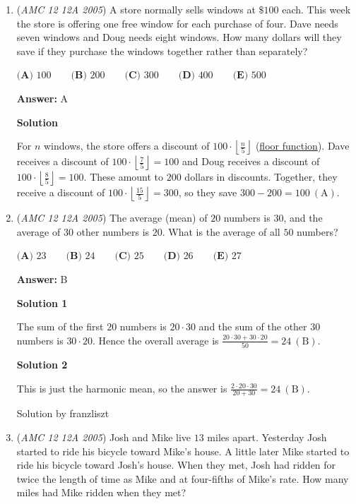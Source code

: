 \begin{enumerate}
 


	\item (\textit{AMC 12 12A 2005}) A store normally sells windows at $\$100$ each. This week the store is offering one free window for each purchase of four. Dave needs seven windows and Doug needs eight windows. How many dollars will they save if they purchase the windows together rather than separately?


 $\textbf{(A) } 100 \qquad \textbf{(B) } 200 \qquad \textbf{(C) } 300 \qquad \textbf{(D) } 400 \qquad \textbf{(E) } 500$

 \textbf{Answer: }A



\textbf{Solution}

For $n$ windows, the store offers a discount of $100 \cdot \left\lfloor\frac{n}{5}\right\rfloor$ (\href{https://artofproblemsolving.com/wiki/index.php?title=Floor\_function}{floor function}). Dave receives a discount of $100 \cdot \left\lfloor \frac{7}{5}\right \rfloor = 100$ and Doug receives a discount of $100 \cdot \left\lfloor \frac{8}{5}\right\rfloor = 100$. These amount to $200$ dollars in discounts. Together, they receive a discount of $100 \cdot \left\lfloor \frac{15}{5} \right\rfloor = 300$, so they save $300-200=100\ \mathrm{(A)}$.

 


	\item (\textit{AMC 12 12A 2005}) The average (mean) of $20$ numbers is $30$, and the average of $30$ other numbers is $20$. What is the average of all $50$ numbers?


 $\textbf{(A) } 23 \qquad \textbf{(B) } 24 \qquad \textbf{(C) } 25 \qquad \textbf{(D) } 26 \qquad \textbf{(E) } 27$

 \textbf{Answer: }B



\textbf{Solution 1}

The sum of the first $20$ numbers is $20 \cdot 30$ and the sum of the other $30$ numbers is $30\cdot 20$. Hence the overall average is $\frac{20 \cdot 30 + 30 \cdot 20}{50} = 24 \ \mathrm{(B)}$.

 



\textbf{Solution 2}

This is just the harmonic mean, so the answer is $\frac{2 \cdot 20 \cdot 30}{20+30}=24 \ \mathrm{(B)}$.

 Solution by franzliszt

 


	\item (\textit{AMC 12 12A 2005}) Josh and Mike live $13$ miles apart. Yesterday Josh started to ride his bicycle toward Mike's house. A little later Mike started to ride his bicycle toward Josh's house. When they met, Josh had ridden for twice the length of time as Mike and at four-fifths of Mike's rate. How many miles had Mike ridden when they met?



\end{enumerate}
